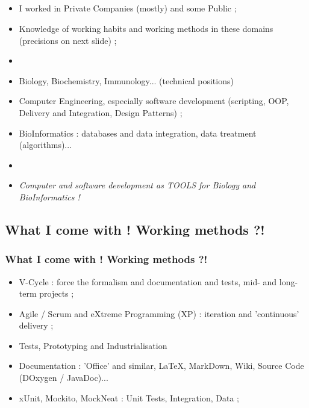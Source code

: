 \documentclass{beamer}
\begin{document}
\subsection{ \titleSubSectionPositionPartOne }
\begin{frame}
	\frametitle{ \titleSubSectionPositionPartOne }
	\begin{itemize}
		\item I worked in Private Companies (mostly) and some Public ; 
		\item Knowledge of working habits and working methods in these domains (precisions on next slide) ;  
		\item[]
		\item Biology, Biochemistry, Immunology... (technical positions)
		\item Computer Engineering, especially software development (scripting, OOP, Delivery and Integration, Design Patterns) ; 
		\item BioInformatics : databases and data integration, data treatment (algorithms)... 
		\item[] 
		\item \emph{Computer and software development as TOOLS for Biology and BioInformatics !}
	\end{itemize}
\end{frame} 

\def\titleSubSectionPositionPartTwo{What I come with ! Working methods ?!}
\subsection{ \titleSubSectionPositionPartTwo }
\begin{frame}
	\frametitle{ \titleSubSectionPositionPartTwo }
	\begin{itemize}
		\item V-Cycle : force the formalism and documentation and tests, mid- and long-term projects ; 
		\item Agile / Scrum and eXtreme Programming (XP) : iteration and 'continuous' delivery ; 
		\item Tests, Prototyping and Industrialisation
		\item Documentation : 'Office' and similar, \LaTeX , MarkDown, Wiki, Source Code (DOxygen / JavaDoc)...
		\item xUnit, Mockito, MockNeat : Unit Tests, Integration, Data ; 
	\end{itemize}
\end{frame} 
\end{document}
